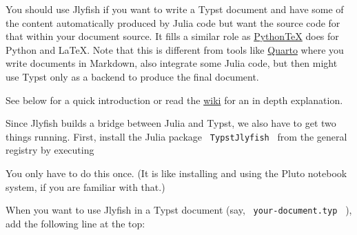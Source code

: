 \href{https://github.com/andreasKroepelin/TypstJlyfish.jl/wiki}{}
\href{https://github.com/andreasKroepelin/TypstJlyfish.jl}{}

You should use Jlyfish if you want to write a Typst document and have
some of the content automatically produced by Julia code but want the
source code for that within your document source. It fills a similar
role as \href{https://github.com/gpoore/pythontex}{PythonTeX} does for
Python and LaTeX. Note that this is different from tools like
\href{https://quarto.org/}{Quarto} where you write documents in
Markdown, also integrate some Julia code, but then might use Typst only
as a backend to produce the final document.

See below for a quick introduction or read the
\href{https://github.com/andreasKroepelin/TypstJlyfish.jl/wiki}{wiki}
for an in depth explanation.

Since Jlyfish builds a bridge between Julia and Typst, we also have to
get two things running. First, install the Julia package
\texttt{\ TypstJlyfish\ } from the general registry by executing

\begin{Shaded}
\begin{Highlighting}[]
\NormalTok{julia\textgreater{} ]}

\end{Highlighting}
\end{Shaded}

You only have to do this once. (It is like installing and using the
Pluto notebook system, if you are familiar with that.)

When you want to use Jlyfish in a Typst document (say,
\texttt{\ your-document.typ\ } ), add the following line at the top:

\begin{Shaded}
\begin{Highlighting}[]
\end{Highlighting}
\end{Shaded}

